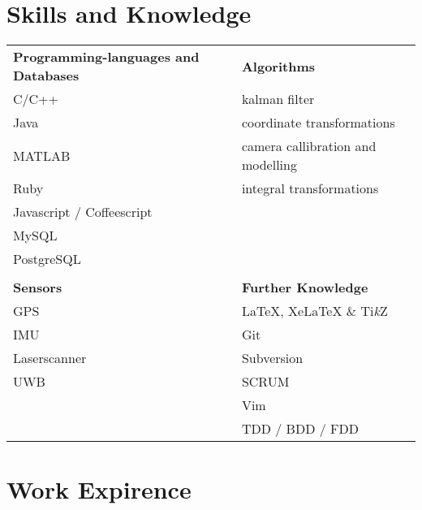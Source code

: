 \documentclass[a4paper,10pt]{article} %
\begin{document}
 
\section{Skills and Knowledge}
 
\begin{tabular}{ll}
  \textbf{Programming-languages and Databases} & \textbf{Algorithms}\\
C/C++                                          & kalman filter \\
Java                                           & coordinate transformations \\ 
MATLAB                                         & camera callibration and modelling \\ 
Ruby                                           & integral transformations  \\ 
Javascript / Coffeescript                      & \\ 
MySQL                                          & \\ 
PostgreSQL                                     & \\ 
                                               & \\ 
\textbf{Sensors}                               & \textbf{Further Knowledge }\\
GPS                                            & LaTeX, XeLaTeX \& Ti\textit{k}Z\\ 
IMU                                            & Git \\ 
Laserscanner                                   & Subversion \\ 
UWB                                            & SCRUM \\ 
                                               & Vim \\
                                               & TDD / BDD / FDD 
\end{tabular}
 
 
\section{Work Expirence}
 
\end{document}
